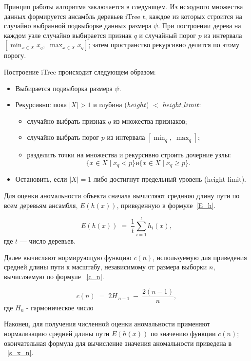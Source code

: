 Принцип работы алгоритма заключается в следующем. Из исходного множества данных формируется ансамбль деревьев iTree \(t\), каждое из которых строится на случайно выбранной подвыборке данных размера \(\psi\). При построении дерева на каждом узле случайно выбирается признак \(q\) и случайный порог \(p\) из интервала \([\min_{x\in X} x_q,\;\max_{x\in X} x_q]\); затем пространство рекурсивно делится по этому порогу.

Построение iTree происходит следующем образом:

\begin{itemize}
    \item Выбирается подвыборка размера \(\psi\).
    \item Рекурсивно: пока \( |X|>1 \) и глубина ($height$) $<$ $height\_limit$:
    \begin{itemize}
        \item случайно выбрать признак \(q\) из множества признаков;
        \item случайно выбрать порог \(p\) из интервала $[\min_q,\;\max_q]$;
        \item разделить точки на множества и рекурсивно строить дочерние узлы: $$\{x\in X \mid x_q < p\}  \textit{и}  \{x\in X \mid x_q \ge p\}.$$
    \end{itemize}
    \item Остановить, если $|X|=1$ либо достигнут предельный уровень (height limit).
\end{itemize}

Для оценки аномальности объекта сначала вычисляют среднюю длину пути по всем деревьям ансамбля, \(E(h(x))\), приведенную в формуле~\ref{E_h}. 

\begin{equation}\label{E_h}
    E(h(x)) \;=\; \frac{1}{t}\sum_{i=1}^{t} h_i(x),
\end{equation}
где \(t\) — число деревьев.

Далее вычисляют нормирующую функцию \(c(n)\), используемую для приведения средней длины пути к масштабу, независимому от размера выборки \(n\), вычисляемую по формуле ~\ref{c_n}.

\begin{equation}\label{c_n}
    c(n) \;=\; 2H_{\,n-1} \;-\; \frac{2(n-1)}{n},
\end{equation}
где $H_{n}$ - гармоническое число

Наконец, для получения численной оценки аномальности применяют нормализацию средней длины пути \(E(h(x))\) по значению функции \(c(n)\); окончательная формула для вычисление значения аномальности приведена в ~\ref{s_x_n}.

